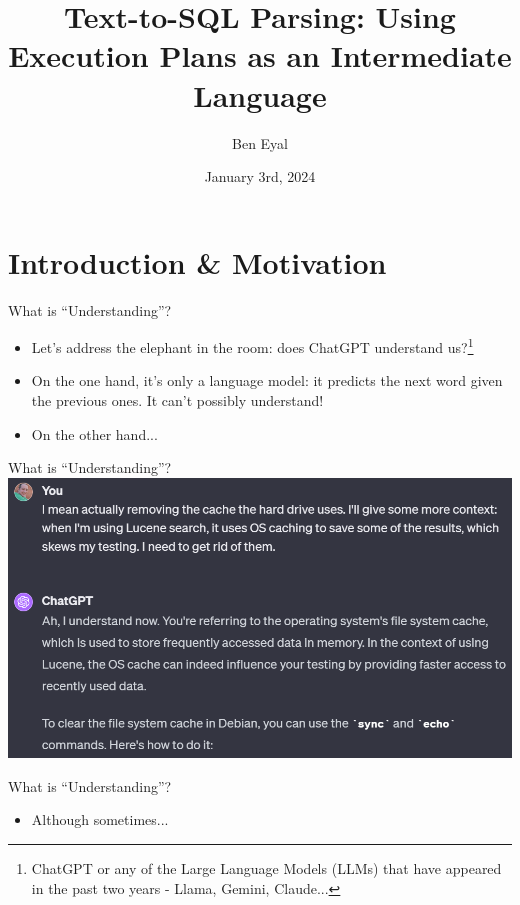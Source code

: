 \documentclass{beamer}
\title[CS PhD Seminar]{Text-to-SQL Parsing: Using Execution Plans as an Intermediate Language}
\author{Ben Eyal}
\date{January 3rd, 2024}
\begin{document}
\beamertemplatenavigationsymbolsempty

\begin{frame}
    \titlepage
\end{frame}

\section{Introduction \& Motivation}

\begin{frame}{What is ``Understanding''?}
    \begin{itemize}
        \item Let's address the elephant in the room: does ChatGPT \alert{understand} us?\footnote{ChatGPT or any of the Large Language Models (LLMs) that have appeared in the past two years - Llama, Gemini, Claude...}
        
        \pause
        
        \item On the one hand, it's only a language model: it predicts the next word given the previous ones. It can't possibly understand!
        
        \pause
        
        \item On the other hand...
    \end{itemize}
\end{frame}

\begin{frame}{What is ``Understanding''?}
    \includegraphics[width=\textwidth]{chatgpt_convo_1.png}
\end{frame}

\begin{frame}{What is ``Understanding''?}
    \begin{itemize}
        \item Although sometimes...
    \end{itemize}
\end{frame}
\end{document}
